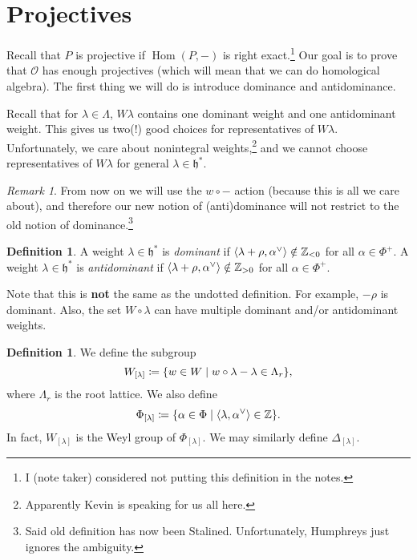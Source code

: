 \documentclass[leqno, openany]{memoir}
\theoremstyle{definition}
\newtheorem{defn}[thm]{Definition}
\theoremstyle{remark}
\newtheorem{rmk}[thm]{Remark}
\theoremstyle{plain}
\theoremstyle{definition}
\theoremstyle{remark}
\newcommand{\Z}{\mathbb{Z}}
\newcommand{\cO}{\mathcal{O}}
\newcommand{\h}{\mathfrak{h}}
\DeclareMathOperator{\Hom}{Hom}
\begin{document}
\section{Projectives}%
\label{sec:projectives}

Recall that $P$ is projective if $\Hom(P,-)$ is right exact.\footnote{I (note taker) considered not putting this definition in the notes.} Our goal is to prove that $\cO$ has enough projectives (which will mean that we can do homological algebra). The first thing we will do is introduce dominance and antidominance.

Recall that for $\lambda \in \Lambda$, $W \lambda$ contains one dominant weight and one antidominant weight. This gives us two(!) good choices for representatives of $W \lambda$. Unfortunately, we care about nonintegral weights,\footnote{Apparently Kevin is speaking for us all here.} and we cannot choose representatives of $W \lambda$ for general $\lambda \in \h^*$.

\begin{rmk}
    From now on we will use the $w \circ -$ action (because this is all we care about), and therefore our new notion of (anti)dominance will not restrict to the old notion of dominance.\footnote{Said old definition has now been Stalined. Unfortunately, Humphreys just ignores the ambiguity.}
\end{rmk}

\begin{defn}
    A weight $\lambda \in \h^*$ is \textit{dominant} if $\ev{\lambda + \rho, \alpha^{\vee}} \notin \Z_{< 0}$ for all $\alpha \in \Phi^+$. A weight $\lambda \in \h^*$ is \textit{antidominant} if $\ev{\lambda + \rho, \alpha^{\vee}} \notin \Z_{>0}$ for all $\alpha \in \Phi^+$.
\end{defn}

Note that this is \textbf{not} the same as the undotted definition. For example, $-\rho$ is dominant. Also, the set $W \circ \lambda$ can have multiple dominant and/or antidominant weights.

\begin{defn}
    We define the subgroup
    \[ W_{[\lambda]} \coloneqq \qty{w \in W \mid w \circ \lambda - \lambda \in \Lambda_r}, \]
    where $\Lambda_r$ is the root lattice. We also define
    \[ \Phi_{[\lambda]} \coloneqq \qty{\alpha \in \Phi \mid \ev{\lambda, \alpha^{\vee}} \in \Z}. \]
    In fact, $W_{[\lambda]}$ is the Weyl group of $\Phi_{[\lambda]}$. We may similarly define $\Delta_{[\lambda]}$.
\end{defn}
\end{document}
